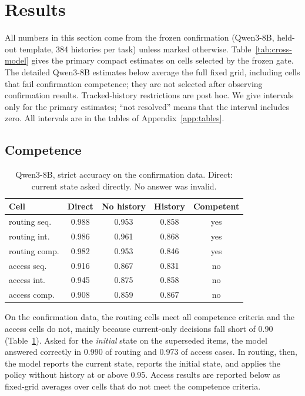 \section{Results}
\label{sec:results}

All numbers in this section come from the frozen confirmation (Qwen3-8B, held-out template, 384 histories
per task) unless marked otherwise. Table~\ref{tab:cross-model} gives the primary compact estimates on
cells selected by the frozen gate. The detailed Qwen3-8B estimates below average the full fixed grid,
including cells that fail confirmation competence; they are not selected after observing confirmation
results. Tracked-history restrictions are post hoc. We give intervals only for the primary estimates; ``not resolved'' means
that the interval includes zero. All intervals are in the tables of Appendix~\ref{app:tables}.

\subsection{Competence}
\label{sec:results-competence}

\begin{table}[t]
\centering
\small
\setlength{\tabcolsep}{4pt}
\begin{tabular}{@{}lcccc@{}}
\toprule
Cell & Direct & No history & History & Competent \\
\midrule
routing seq.  & 0.988 & 0.953 & 0.858 & yes \\
routing int.  & 0.986 & 0.961 & 0.868 & yes \\
routing comp. & 0.982 & 0.953 & 0.846 & yes \\
\midrule
access seq.   & 0.916 & 0.867 & 0.831 & no \\
access int.   & 0.945 & 0.875 & 0.858 & no \\
access comp.  & 0.908 & 0.859 & 0.867 & no \\
\bottomrule
\end{tabular}
\caption{Qwen3-8B, strict accuracy on the confirmation data. Direct: current state asked directly. No
answer was invalid.}
\label{tab:competence}
\end{table}

On the confirmation data, the routing cells meet all competence criteria and the access cells do not, mainly because current-only
decisions fall short of 0.90 (Table~\ref{tab:competence}). Asked for the \emph{initial} state on the
superseded items, the model answered correctly in 0.990 of routing and 0.973 of access cases. In routing,
then, the model reports the current state, reports the initial state, and applies the policy without
history at or above 0.95. Access results are reported below as fixed-grid averages over cells that do not
meet the competence criteria.

